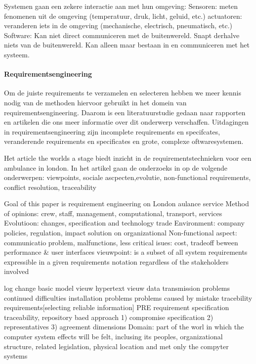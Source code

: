 Systemen gaan een zekere interactie aan met hun omgeving:
Sensoren: meten fenomenen uit de omgeving (temperatuur,
druk, licht, geluid, etc.)
actuatoren: veranderen iets in de omgeving (mechanische,
electrisch, pneumatisch, etc.)
Software:
Kan niet direct communiceren met de buitenwereld.
Snapt derhalve niets van de buitenwereld.
Kan alleen maar bestaan in en communiceren met het
systeem.


\paragraph{Requirementsengineering}

Om de juiste requirements te verzamelen en selecteren hebben we meer kennis nodig van de methoden hiervoor gebruikt in het domein van requirementsengineering. Daarom is een literatuurstudie gedaan naar rapporten en artikelen die ons meer informatie over dit onderwerp verschaffen.
 Uitdagingen in requirementsengineering zijn incomplete requirements en specifcates, veranderende requirements en specificates en grote, complexe oftwaresystemen.
 
 Het article the worlds a stage biedt inzicht in de requirementstechnieken voor een ambulance in london. In het artikel gaan de onderzoeks in op de volgende onderwerpen: 
 viewpoints, sociale ascpecten,evolutie, non-functional requirements, conflict resolution, traceability
 
 Goal of this paper is requirement  engineering on London aulance service
 Method of opinions: crew, staff, management, computational, transport, services
 Evolutioon: changes, specification and technology trade
 Environment: company policies, regulation, impact solution on organizational
 Non-functional aspect: communicatio problem, malfunctions, less critical isues: cost, tradeoff beween performance \& user interfaces
 vieuwpoint: is a subset of all system requirements expressible in a given requirements notation regardless of the stakeholders involved
 
 log change
 basic model vieuw
 hypertext vieuw
 data transmission problems
 continued difficulties
 installation problems
 problems caused by mistake
 tracebility requirements[selecting reliable information]
 PRE requirement specification traceability, repository baed approach
 1) compromise specification
 2) representatives
 3) agreement dimensions
 Domain: part of the worl in which the computer system effects will be felt, inclusing its peoples, organizational structure, related legislation, physical location and met only the compyter systems
 
